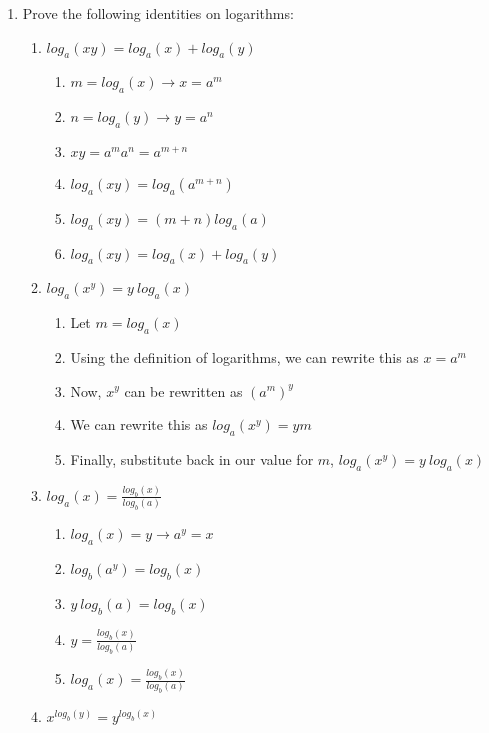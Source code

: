 \documentclass[12pt]{article}
\begin{document}
\begin{enumerate}
    \item Prove the following identities on logarithms:
        \begin{enumerate}
            \item $log_a(xy) = log_a(x) + log_a(y)$
                \begin{enumerate}
                    \item $m = log_a (x) \rightarrow x = a^m$
                    \item $n = log_a (y) \rightarrow y = a^n$
                    \item $xy = a^m a^n = a^{m+n}$
                    \item $log_a (xy) = log_a(a^{m+n})$
                    \item $log_a (xy) = (m + n)log_a(a)$
                    \item $log_a (xy) = log_a(x) + log_a(y)$
                \end{enumerate}
            \item $log_a(x^y) = y\ log_a(x)$
                \begin{enumerate}
                    \item Let $m = log_a (x)$
                    \item Using the definition of logarithms, we can rewrite this as $x = a^m$
                    \item Now, $x^y$ can be rewritten as $(a^m)^y$
                    \item We can rewrite this as $log_a (x^y) = ym$
                    \item Finally, substitute back in our value for $m$, $log_a (x^y) = y\ log_a (x)$
                \end{enumerate}
            \item $log_a(x) = \frac{log_b (x)}{log_b (a)}$
                \begin{enumerate}
                    \item $log_a(x) = y \rightarrow a^y = x$
                    \item $log_b(a^y) = log_b(x)$
                    \item $y\ log_b(a) = log_b(x)$
                    \item $y = \frac{log_b(x)}{log_b(a)}$
                    \item $log_a(x) = \frac{log_b(x)}{log_b(a)}$
                \end{enumerate}
            \item $x^{log_b (y)} = y^{log_b (x)}$

\end{enumerate}
\end{enumerate}
\end{document}
